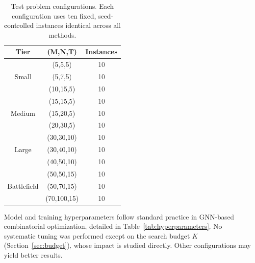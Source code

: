 \begin{table}[htbp]
\centering
\small
\caption{Test problem configurations. Each configuration uses ten fixed, seed-controlled instances identical across all methods.}
\label{tab:problem_instance_scales}
\begin{tabular}{c|c|c}
\hline
\textbf{Tier} & \textbf{(M,N,T)} & \textbf{Instances} \\ \hline
\multirow{3}{*}{Small}      & (5,5,5)    & 10 \\
                            & (5,7,5)    & 10 \\
                            & (10,15,5)  & 10 \\ \hline
\multirow{3}{*}{Medium}     & (15,15,5)  & 10 \\
                            & (15,20,5)  & 10 \\
                            & (20,30,5)  & 10 \\ \hline
\multirow{3}{*}{Large}      & (30,30,10) & 10 \\
                            & (30,40,10) & 10 \\
                            & (40,50,10) & 10 \\ \hline
\multirow{3}{*}{Battlefield} & (50,50,15) & 10 \\
                            & (50,70,15) & 10 \\
                            & (70,100,15) & 10 \\ \hline
\end{tabular}
\end{table}



Model and training hyperparameters follow standard practice in GNN-based
combinatorial optimization, detailed in Table~\ref{tab:hyperparameters}. No
systematic tuning was performed except on the search budget $K$
(Section~\ref{sec:budget}), whose impact is studied directly. Other configurations may yield better results.

